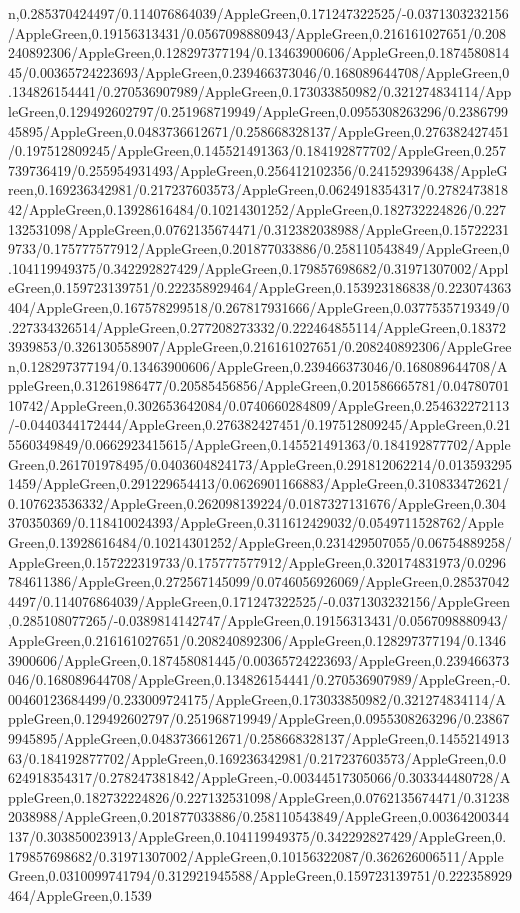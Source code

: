 {\begin{tikzternal}
{n,0.285370424497/0.114076864039/AppleGreen,0.171247322525/-0.0371303232156/AppleGreen,0.19156313431/0.0567098880943/AppleGreen,0.216161027651/0.208240892306/AppleGreen,0.128297377194/0.13463900606/AppleGreen,0.187458081445/0.00365724223693/AppleGreen,0.239466373046/0.168089644708/AppleGreen,0.134826154441/0.270536907989/AppleGreen,0.173033850982/0.321274834114/AppleGreen,0.129492602797/0.251968719949/AppleGreen,0.0955308263296/0.238679945895/AppleGreen,0.0483736612671/0.258668328137/AppleGreen,0.276382427451/0.197512809245/AppleGreen,0.145521491363/0.184192877702/AppleGreen,0.257739736419/0.255954931493/AppleGreen,0.256412102356/0.241529396438/AppleGreen,0.169236342981/0.217237603573/AppleGreen,0.0624918354317/0.278247381842/AppleGreen,0.13928616484/0.10214301252/AppleGreen,0.182732224826/0.227132531098/AppleGreen,0.0762135674471/0.312382038988/AppleGreen,0.157222319733/0.175777577912/AppleGreen,0.201877033886/0.258110543849/AppleGreen,0.104119949375/0.342292827429/AppleGreen,0.179857698682/0.31971307002/AppleGreen,0.159723139751/0.222358929464/AppleGreen,0.153923186838/0.223074363404/AppleGreen,0.167578299518/0.267817931666/AppleGreen,0.0377535719349/0.227334326514/AppleGreen,0.277208273332/0.222464855114/AppleGreen,0.183723939853/0.326130558907/AppleGreen,0.216161027651/0.208240892306/AppleGreen,0.128297377194/0.13463900606/AppleGreen,0.239466373046/0.168089644708/AppleGreen,0.31261986477/0.20585456856/AppleGreen,0.201586665781/0.0478070110742/AppleGreen,0.302653642084/0.0740660284809/AppleGreen,0.254632272113/-0.0440344172444/AppleGreen,0.276382427451/0.197512809245/AppleGreen,0.215560349849/0.0662923415615/AppleGreen,0.145521491363/0.184192877702/AppleGreen,0.261701978495/0.0403604824173/AppleGreen,0.291812062214/0.0135932951459/AppleGreen,0.291229654413/0.0626901166883/AppleGreen,0.310833472621/0.107623536332/AppleGreen,0.262098139224/0.0187327131676/AppleGreen,0.304370350369/0.118410024393/AppleGreen,0.311612429032/0.0549711528762/AppleGreen,0.13928616484/0.10214301252/AppleGreen,0.231429507055/0.06754889258/AppleGreen,0.157222319733/0.175777577912/AppleGreen,0.320174831973/0.0296784611386/AppleGreen,0.272567145099/0.0746056926069/AppleGreen,0.285370424497/0.114076864039/AppleGreen,0.171247322525/-0.0371303232156/AppleGreen,0.285108077265/-0.0389814142747/AppleGreen,0.19156313431/0.0567098880943/AppleGreen,0.216161027651/0.208240892306/AppleGreen,0.128297377194/0.13463900606/AppleGreen,0.187458081445/0.00365724223693/AppleGreen,0.239466373046/0.168089644708/AppleGreen,0.134826154441/0.270536907989/AppleGreen,-0.00460123684499/0.233009724175/AppleGreen,0.173033850982/0.321274834114/AppleGreen,0.129492602797/0.251968719949/AppleGreen,0.0955308263296/0.238679945895/AppleGreen,0.0483736612671/0.258668328137/AppleGreen,0.145521491363/0.184192877702/AppleGreen,0.169236342981/0.217237603573/AppleGreen,0.0624918354317/0.278247381842/AppleGreen,-0.00344517305066/0.303344480728/AppleGreen,0.182732224826/0.227132531098/AppleGreen,0.0762135674471/0.312382038988/AppleGreen,0.201877033886/0.258110543849/AppleGreen,0.00364200344137/0.303850023913/AppleGreen,0.104119949375/0.342292827429/AppleGreen,0.179857698682/0.31971307002/AppleGreen,0.10156322087/0.362626006511/AppleGreen,0.0310099741794/0.312921945588/AppleGreen,0.159723139751/0.222358929464/AppleGreen,0.1539}
\end{tikzternal}}
